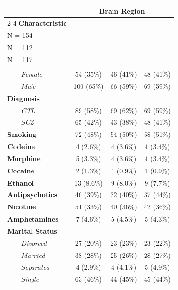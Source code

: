 \begin{table}[t]
\fontsize{12.0pt}{14.0pt}\selectfont
\begin{tabular*}{\linewidth}{@{\extracolsep{\fill}}lccc}
\toprule
 & \multicolumn{3}{c}{\textbf{Brain Region}} \\ 
\cmidrule(lr){2-4}
\textbf{Characteristic} & \shortstack[l]{\textbf{Caudate} \\N = 154}\textsuperscript{\textit{1}} & \shortstack[l]{\textbf{DLPFC} \\N = 112}\textsuperscript{\textit{1}} & \shortstack[l]{\textbf{Hippocampus} \\N = 117}\textsuperscript{\textit{1}} \\ 
\midrule\addlinespace[2.5pt]
{\bfseries Sex} &  &  &  \\ 
{\itshape     Female} & 54 (35\%) & 46 (41\%) & 48 (41\%) \\ 
{\itshape     Male} & 100 (65\%) & 66 (59\%) & 69 (59\%) \\ 
{\bfseries Diagnosis} &  &  &  \\ 
{\itshape     CTL} & 89 (58\%) & 69 (62\%) & 69 (59\%) \\ 
{\itshape     SCZ} & 65 (42\%) & 43 (38\%) & 48 (41\%) \\ 
{\bfseries Smoking} & 72 (48\%) & 54 (50\%) & 58 (51\%) \\ 
{\bfseries Codeine} & 4 (2.6\%) & 4 (3.6\%) & 4 (3.4\%) \\ 
{\bfseries Morphine} & 5 (3.3\%) & 4 (3.6\%) & 4 (3.4\%) \\ 
{\bfseries Cocaine} & 2 (1.3\%) & 1 (0.9\%) & 1 (0.9\%) \\ 
{\bfseries Ethanol} & 13 (8.6\%) & 9 (8.0\%) & 9 (7.7\%) \\ 
{\bfseries Antipsychotics} & 46 (39\%) & 32 (40\%) & 37 (44\%) \\ 
{\bfseries Nicotine} & 51 (33\%) & 40 (36\%) & 42 (36\%) \\ 
{\bfseries Amphetamines} & 7 (4.6\%) & 5 (4.5\%) & 5 (4.3\%) \\ 
{\bfseries Marital Status} &  &  &  \\ 
{\itshape     Divorced} & 27 (20\%) & 23 (23\%) & 23 (22\%) \\ 
{\itshape     Married} & 38 (28\%) & 25 (26\%) & 28 (27\%) \\ 
{\itshape     Separated} & 4 (2.9\%) & 4 (4.1\%) & 5 (4.9\%) \\ 
{\itshape     Single} & 63 (46\%) & 44 (45\%) & 45 (44\%) \\ 

\end{tabular*}
\end{table}
